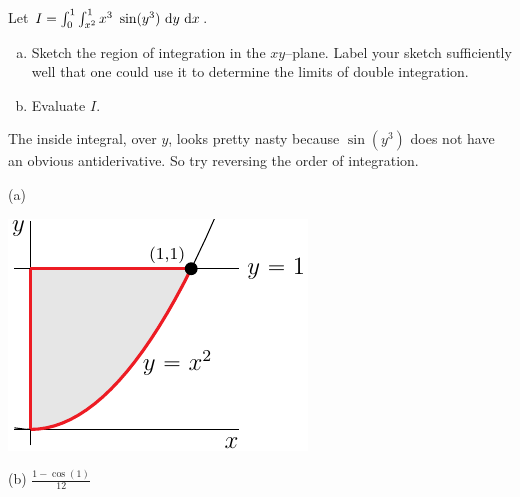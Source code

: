 \begin{question}[M200 2016D] %
Let $I=\int_0^1 \int_{x^2}^1 x^3\ \sin(y^3)\ \dee{y}\ \dee{x}$.
\begin{enumerate}[(a)]
\item
Sketch the region of integration in the $xy$--plane. Label your
sketch sufficiently well that one could use it to determine the
limits of double integration.

\item
Evaluate $I$.

\end{enumerate}
\end{question}

\begin{hint}
The inside integral, over $y$, looks pretty nasty
because $\sin(y^3)$ does not have an obvious antiderivative. So try
reversing the order of integration.
\end{hint}

\begin{answer}
(a)
\begin{center}
     \includegraphics{fig/OE16D_6.pdf} 
\end{center}
(b) $\frac{1-\cos(1)}{12}$
\end{answer}

